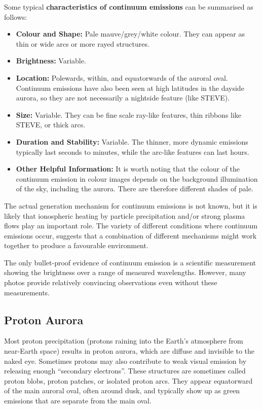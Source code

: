 \documentclass{article}
\newcommand{\contributed}[1]{%
    \par\noindent
    \begingroup
    \setlength{\leftskip}{1em}%
    \itshape
    Contributors: #1
    \par
    \endgroup
    \vspace{0.5em}
}
\begin{document}
Some typical {\bf characteristics of continuum emissions} can be summarised as follows:
\begin{itemize}
    \item \textbf{Colour and Shape:} Pale mauve/grey/white colour. They can appear as thin or wide arcs or more rayed structures.
    \item \textbf{Brightness:} Variable.
    \item \textbf{Location:} Polewards, within, and equatorwards of the auroral oval. Continuum emissions have also been seen at high latitudes in the dayside aurora, so they are not necessarily a nightside feature (like STEVE).
    \item \textbf{Size:} Variable. They can be fine scale ray-like features, thin ribbons like STEVE, or thick arcs.
    \item \textbf{Duration and Stability:} Variable. The thinner, more dynamic emissions typically last seconds to minutes, while the arc-like features can last hours.
    \item \textbf{Other Helpful Information:} It is worth noting that the colour of the continuum emission in colour images depends on the background illumination of the sky, including the aurora. There are therefore different shades of pale.
    \end{itemize}


The actual generation mechanism for continuum emissions is not known, but it is likely that ionospheric heating by particle precipitation and/or strong plasma flows play an important role. The variety of different conditions where continuum emissions occur, suggests that a combination of different mechanisms might work together to produce a favourable environment.

The only bullet-proof evidence of continuum emission is a scientific measurement showing the brightness over a range of measured wavelengths. However, many photos provide relatively convincing observations even without these measurements. 


\subsection{Proton Aurora}\label{proton-aurora}

Most proton precipitation (protons raining into the Earth's atmosphere from near-Earth space) results in proton aurora, which are diffuse and invisible to the naked eye. Sometimes protons may also contribute to weak visual emission by releasing enough ``secondary electrons''. These structures are sometimes called proton blobs, proton patches, or isolated proton arcs. They  appear equatorward of the main auroral oval, often around dusk, and typically show up as green emissions that are separate from the main oval.
\end{document}
